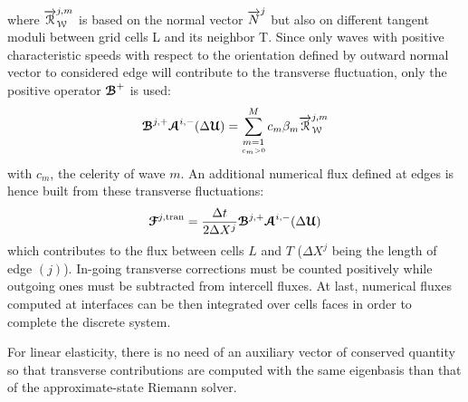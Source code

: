 where ${\overrightarrow{\mathcal{R}}}_{\mathcal{W}}^{j,m}$ is based on the normal vector ${\overrightarrow{N}}^j$ but also on different tangent moduli between grid cells L and its neighbor T. Since only waves with positive characteristic speeds with respect to the orientation defined by outward normal vector to considered edge will contribute to the transverse fluctuation, only the positive operator ${\boldsymbol{\mathcal{B}}}^+$ is used:
\begin{equation}
{\boldsymbol{\mathcal{B}}}^{j,+} {\boldsymbol{\mathcal{A}}}^{i,-}(\Delta {\boldsymbol{\mathcal{U}}}) = \sum_{\underset{c_m >0}{m=1}}^{M} c_m \beta_m {\overrightarrow{\mathcal{R}}}_{\mathcal{W}}^{j,m} \label{eq:transverse_fluctuations}
\end{equation}
with $c_m$, the celerity of wave $m$.
An additional numerical flux defined at edges is hence built from these transverse fluctuations:
\begin{equation}
{\boldsymbol{\mathcal{F}}}^{j,\text{tran}} = \frac{\Delta t}{2 \Delta X^j} {\boldsymbol{\mathcal{B}}}^{j,+} {\boldsymbol{\mathcal{A}}}^{i,-}(\Delta {\boldsymbol{\mathcal{U}}}) \label{eq:transverse_corrections}
\end{equation}
which contributes to the flux between cells $L$ and $T$ ($\Delta X^j$ being the length of edge $(j)$). 
In-going transverse corrections must be counted positively while outgoing ones must be subtracted from intercell fluxes. At last, numerical fluxes computed at interfaces can be then integrated over cells faces in order to complete the discrete system.%


\begin{remark} 
  For linear elasticity, there is no need of an auxiliary vector of conserved quantity so that transverse contributions are computed with the same eigenbasis than that of the approximate-state Riemann solver.
\end{remark}

